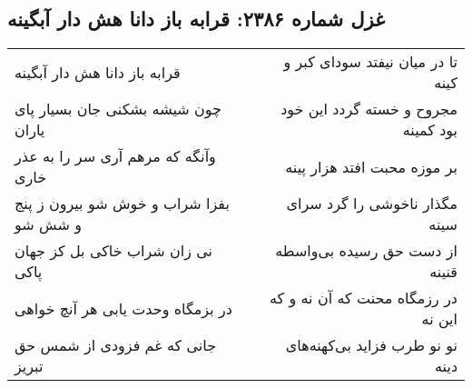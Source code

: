 \begin{center}
\section*{غزل شماره ۲۳۸۶: قرابه باز دانا هش دار آبگینه}
\label{sec:2386}
\begin{longtable}{l p{0.5cm} r}
قرابه باز دانا هش دار آبگینه
&&
تا در میان نیفتد سودای کبر و کینه
\\
چون شیشه بشکنی جان بسیار پای یاران
&&
مجروح و خسته گردد این خود بود کمینه
\\
وآنگه که مرهم آری سر را به عذر خاری
&&
بر موزه محبت افتد هزار پینه
\\
بفزا شراب و خوش شو بیرون ز پنج و شش شو
&&
مگذار ناخوشی را گرد سرای سینه
\\
نی زان شراب خاکی بل کز جهان پاکی
&&
از دست حق رسیده بی‌واسطه قنینه
\\
در بزمگاه وحدت یابی هر آنچ خواهی
&&
در رزمگاه محنت که آن نه و که این نه
\\
جانی که غم فزودی از شمس حق تبریز
&&
نو نو طرب فزاید بی‌کهنه‌های دینه
\\
\end{longtable}
\end{center}
